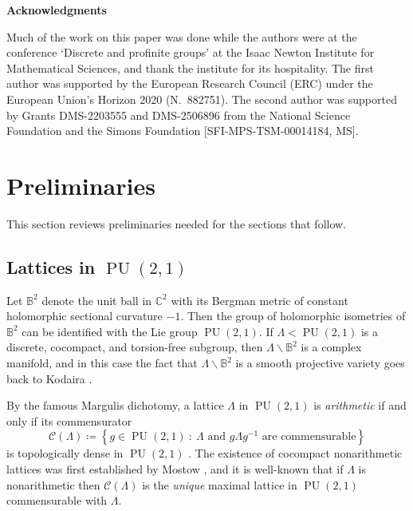 \documentclass[11pt]{article}
\theoremstyle{plain}
\theoremstyle{definition}
\theoremstyle{remark}
\newcommand{\bbB}{\mathbb{B}}
\newcommand{\bbC}{\mathbb{C}}
\newcommand{\calC}{\mathcal{C}}
\newcommand{\Lam}{\Lambda}
\DeclareMathOperator{\PU}{PU}
\newcommand{\bs}{\backslash}
\begin{document}
\medskip

\noindent \textbf{Acknowledgments}

\medskip

\noindent
Much of the work on this paper was done while the authors were at the conference `Discrete and profinite groups' at the Isaac Newton Institute for Mathematical Sciences, and thank the institute for its hospitality. The first author was supported by the European Research Council (ERC) under the European Union’s Horizon 2020 (N.\ 882751). The second author was supported by Grants DMS-2203555 and DMS-2506896 from the National Science Foundation and the Simons Foundation [SFI-MPS-TSM-00014184, MS].

\section{Preliminaries}\label{sec:Prelim}

This section reviews preliminaries needed for the sections that follow.

\subsection{Lattices in $\PU(2,1)$}\label{ssec:PU21}

Let $\bbB^2$ denote the unit ball in $\bbC^2$ with its Bergman metric of constant holomorphic sectional curvature $-1$. Then the group of holomorphic isometries of $\bbB^2$ can be identified with the Lie group $\PU(2,1)$. If ${\Lam < \PU(2,1)}$ is a discrete, cocompact, and torsion-free subgroup, then $\Lam \bs \bbB^2$ is a complex manifold, and in this case the fact that $\Lam \bs \bbB^2$ is a smooth projective variety goes back to Kodaira \cite{Kodaira}.

By the famous Margulis dichotomy, a lattice $\Lam$ in $\PU(2,1)$ is \emph{arithmetic} if and only if its commensurator
\begin{equation}\label{eq:Commensurator}
\calC(\Lam) \coloneqq \left\{g \in \PU(2,1)\ :\ \Lam \textrm{ and } g \Lam g^{-1} \textrm{ are commensurable}\right\}
\end{equation}
is topologically dense in $\PU(2,1)$ \cite[p.\ 4]{Margulis}. The existence of cocompact nonarithmetic lattices was first established by Mostow \cite{Mostow}, and it is well-known that if $\Lam$ is nonarithmetic then $\calC(\Lam)$ is the \emph{unique} maximal lattice in $\PU(2,1)$ commensurable with $\Lam$.
\end{document}

